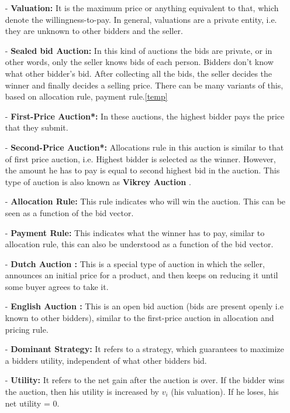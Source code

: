 \documentclass[a4paper]{article}
\begin{document}
\begin{itemize}
    \item[-] \textbf{Valuation:} It is the maximum price or anything equivalent to that, which denote the willingness-to-pay. 
    In general, valuations are a private entity, i.e. they are unknown to other bidders and the seller.  


    \item[-] \textbf{Sealed bid Auction:} In this kind of auctions the bids are private, or in other words, only the seller knows bids of each person.
    Bidders don't know what other bidder's bid.
    After collecting all the bids, the seller decides the winner and finally decides a selling price.
    There can be many variants of this, based on allocation rule, payment rule.\ref{temp}

    \item[-] \textbf{First-Price Auction*:} In these auctions, the highest bidder pays the price that they submit. \label{temp}

    \item[-] \textbf{Second-Price Auction*:} Allocations rule in this auction is similar to that of first price auction, i.e. Highest bidder is selected as the winner.
    However, the amount he has to pay is equal to second highest bid in the auction.
    This type of auction is also known as \textbf{Vikrey Auction} \cite{stanford}.

    \item[-] \textbf{Allocation Rule:} This rule indicates who will win the auction.
    This can be seen as a function of the bid vector.

    \item[-] \textbf{Payment Rule:} This indicates what the winner has to pay, similar to allocation rule, this can also be understood as a function of the bid vector.

    \item[-] \textbf{Dutch Auction \cite{vijay}:} This is a special type of auction in which the seller, announces an initial price for a product, and then keeps on reducing it until some buyer agrees to take it.

    \item[-] \textbf{English Auction \cite{vijay}:} This is an open bid auction (bids are present openly i.e known to other bidders), similar to the first-price auction in allocation and pricing rule.

    \item[-] \textbf{Dominant Strategy:} It refers to a strategy, which guarantees to maximize a bidders utility, independent of what other bidders bid.

    \item[-] \textbf{Utility:} It refers to the net gain after the auction is over. If the bidder wins the auction, then his utility is increased by $v_i$ (his valuation). If he loses, his net utility = $0$.
\end{itemize}
\end{document}
